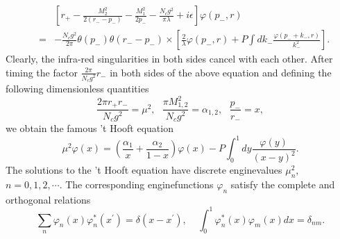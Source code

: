 \documentclass[8pt]{beamer}
\begin{document}
\begin{frame}
	\begin{eqnarray}
		&&[r_{+}-\frac{M_2^2}{2(r_{-}-p_{-})}-\frac{M_1^2}{2p_{-}}-\frac{N_c
			g^2}{\pi \lambda}+i\epsilon]\varphi(p_{-},r)\nonumber\\
		&=&-\frac{N_c
			g^2}{2\pi}\theta(p_{-})\theta(r_{-}-p_{-})\times[\frac{2}{\lambda}\varphi(p_{-},r)+P\int
			dk_{-}\frac{\varphi(p_{-}+k_{-},r)}{k_{-}^2}].
	\end{eqnarray}
	Clearly, the infra-red singularities in both sides cancel with each
	other. After timing the factor $\frac{2\pi}{N_c g^2}r_{-}$ in both
	sides of the above equation and defining the following dimensionless
	quantities
	\begin{equation}
		\frac{2\pi r_{+}r_{-}}{N_c g^2}=\mu^2,\ \ \ \frac{\pi M_{1,2}^2}{N_c
			g^2}=\alpha_{1,2},\ \ \ \frac{p_{-}}{r_{-}}=x,\label{Dless}
	\end{equation}
	we obtain the famous 't Hooft equation
	\begin{equation}
		\mu^2
		\varphi(x)=(\frac{\alpha_{1}}{x}+\frac{\alpha_{2}}{1-x})\varphi(x)-P\int_0^1
		dy\frac{\varphi(y)}{(x-y)^2}.\label{teq}
	\end{equation}
	The solutions to the 't Hooft equation have discrete enginevalues
	$\mu_n^2$, $n=0,1,2,\cdots$. The corresponding enginefunctions
	$\varphi_n$ satisfy the complete and orthogonal relations
	\begin{equation}
		\sum_{n}\varphi_{n}(x)\varphi_{n}^{\ast}(x^\prime)=\delta(x-x^\prime),\
		\ \ \ \ \int_0^1\varphi_{n}^{\ast}(x)\varphi_{m}(x)dx=\delta_{nm}.
	\end{equation}
\end{frame}
\end{document}

